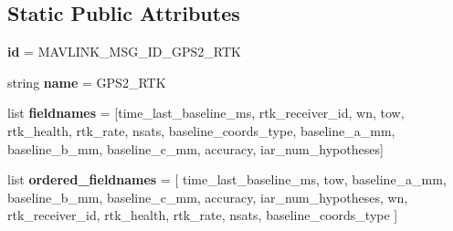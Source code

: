\subsection*{Static Public Attributes}
\begin{DoxyCompactItemize}
\item 
\mbox{\label{classpymavlink_1_1dialects_1_1v10_1_1MAVLink__gps2__rtk__message_a89b98d9dab162f8cd966b2ed6c228fcf}} 
{\bfseries id} = M\+A\+V\+L\+I\+N\+K\+\_\+\+M\+S\+G\+\_\+\+I\+D\+\_\+\+G\+P\+S2\+\_\+\+R\+TK
\item 
\mbox{\label{classpymavlink_1_1dialects_1_1v10_1_1MAVLink__gps2__rtk__message_a330abc1dd8247cc9d69499350466c8f3}} 
string {\bfseries name} = \textquotesingle{}G\+P\+S2\+\_\+\+R\+TK\textquotesingle{}
\item 
\mbox{\label{classpymavlink_1_1dialects_1_1v10_1_1MAVLink__gps2__rtk__message_a8142e512d27c50bc8ff8076cdaad28bd}} 
list {\bfseries fieldnames} = \mbox{[}\textquotesingle{}time\+\_\+last\+\_\+baseline\+\_\+ms\textquotesingle{}, \textquotesingle{}rtk\+\_\+receiver\+\_\+id\textquotesingle{}, \textquotesingle{}wn\textquotesingle{}, \textquotesingle{}tow\textquotesingle{}, \textquotesingle{}rtk\+\_\+health\textquotesingle{}, \textquotesingle{}rtk\+\_\+rate\textquotesingle{}, \textquotesingle{}nsats\textquotesingle{}, \textquotesingle{}baseline\+\_\+coords\+\_\+type\textquotesingle{}, \textquotesingle{}baseline\+\_\+a\+\_\+mm\textquotesingle{}, \textquotesingle{}baseline\+\_\+b\+\_\+mm\textquotesingle{}, \textquotesingle{}baseline\+\_\+c\+\_\+mm\textquotesingle{}, \textquotesingle{}accuracy\textquotesingle{}, \textquotesingle{}iar\+\_\+num\+\_\+hypotheses\textquotesingle{}\mbox{]}
\item 
\mbox{\label{classpymavlink_1_1dialects_1_1v10_1_1MAVLink__gps2__rtk__message_a027b9376b702996d8ae2fddd4137bbe7}} 
list {\bfseries ordered\+\_\+fieldnames} = \mbox{[} \textquotesingle{}time\+\_\+last\+\_\+baseline\+\_\+ms\textquotesingle{}, \textquotesingle{}tow\textquotesingle{}, \textquotesingle{}baseline\+\_\+a\+\_\+mm\textquotesingle{}, \textquotesingle{}baseline\+\_\+b\+\_\+mm\textquotesingle{}, \textquotesingle{}baseline\+\_\+c\+\_\+mm\textquotesingle{}, \textquotesingle{}accuracy\textquotesingle{}, \textquotesingle{}iar\+\_\+num\+\_\+hypotheses\textquotesingle{}, \textquotesingle{}wn\textquotesingle{}, \textquotesingle{}rtk\+\_\+receiver\+\_\+id\textquotesingle{}, \textquotesingle{}rtk\+\_\+health\textquotesingle{}, \textquotesingle{}rtk\+\_\+rate\textquotesingle{}, \textquotesingle{}nsats\textquotesingle{}, \textquotesingle{}baseline\+\_\+coords\+\_\+type\textquotesingle{} \mbox{]}

\end{DoxyCompactItemize}

